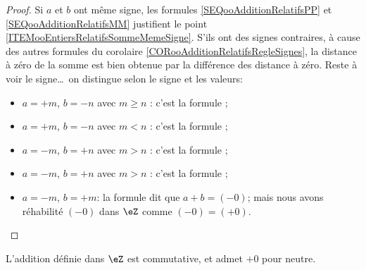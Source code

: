 \begin{proof}
	Si \( a \) et \( b \) ont même signe, les formules \ref{SEQooAdditionRelatifsPP} et \ref{SEQooAdditionRelatifsMM} justifient le point \ref{ITEMooEntiersRelatifsSommeMemeSigne}. S'ils ont des signes contraires, à cause des autres formules du corolaire \ref{CORooAdditionRelatifsRegleSignes}, la distance à zéro de la somme est bien obtenue par la différence des distance à zéro. Reste à voir le signe\dots\ on distingue selon le signe et les valeurs:
 	\begin{itemize}
  		\item \( a = +m \), \( b = -n \) avec \( m \geq n \) : c'est la formule \label{SEQooAdditionRelatifsPMP};
  		\item \( a = +m \), \( b = -n \) avec \( m < n \) : c'est la formule \label{SEQooAdditionRelatifsPMM};
  		\item \( a = -m \), \( b = +n \) avec \( m > n \) : c'est la formule \label{SEQooAdditionRelatifsMPP};
  		\item \( a = -m \), \( b = +n \) avec \( m > n \) : c'est la formule \label{SEQooAdditionRelatifsMPM};
  		\item \( a = -m \), \( b = +m \): la formule \label{SEQooAdditionRelatifsMPM} dit que \( a + b = (-0)\); mais nous avons réhabilité \( (-0) \) dans \( \eZ \) comme \( (-0) = (+0) \).
  	\end{itemize}
\end{proof}

\begin{lemma}	\label{LEMooAdditionRelatifsCommutative}
	L'addition définie dans \( \eZ \) est commutative, et admet \( +0 \) pour neutre.
\end{lemma}

